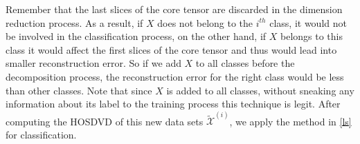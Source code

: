 \documentclass[journal]{IEEEtran}
\begin{document}
	Remember that the last slices of the core tensor are discarded in the dimension reduction process. As a result, if $X$ does not belong to the $i^{th}$ class, it would not be involved in the classification process, on the other hand, if $X$ belongs to this class it would affect the first slices of the core tensor and thus would lead into smaller reconstruction error. So if we add $X$ to all classes before the decomposition process, the reconstruction error for the right class would be less than other classes. Note that since $X$ is added to all classes, without sneaking any information about its label to the training process this technique is legit.      
	After computing the HOSDVD of this new data sets $\widetilde{\mathcal{X}}^{(i)}$, we apply the method in \eqref{ls} for classification.
	
\end{document}
